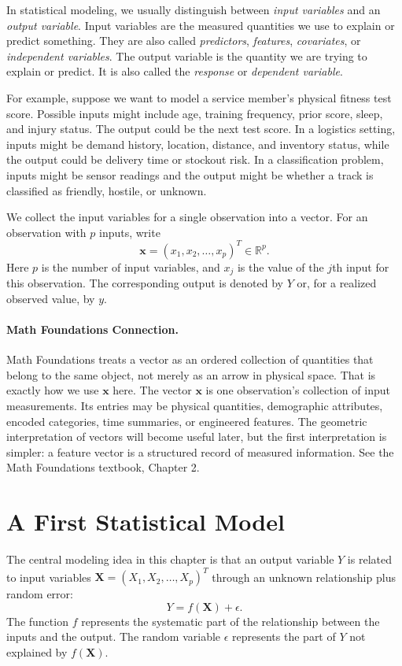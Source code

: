 In statistical modeling, we usually distinguish between \emph{input variables} and an \emph{output variable}.  Input variables are the measured quantities we use to explain or predict something.  They are also called \emph{predictors}, \emph{features}, \emph{covariates}, or \emph{independent variables}.  The output variable is the quantity we are trying to explain or predict.  It is also called the \emph{response} or \emph{dependent variable}.

For example, suppose we want to model a service member's physical fitness test score.  Possible inputs might include age, training frequency, prior score, sleep, and injury status.  The output could be the next test score.  In a logistics setting, inputs might be demand history, location, distance, and inventory status, while the output could be delivery time or stockout risk.  In a classification problem, inputs might be sensor readings and the output might be whether a track is classified as friendly, hostile, or unknown.

We collect the input variables for a single observation into a vector.  For an observation with $p$ inputs, write
\[
  \mathbf{x} = (x_1,x_2,\ldots,x_p)^T \in \mathbb{R}^p.
\]
Here $p$ is the number of input variables, and $x_j$ is the value of the $j$th input for this observation.  The corresponding output is denoted by $Y$ or, for a realized observed value, by $y$.

\paragraph{Math Foundations Connection.}
Math Foundations treats a vector as an ordered collection of quantities that belong to the same object, not merely as an arrow in physical space.  That is exactly how we use $\mathbf{x}$ here.  The vector $\mathbf{x}$ is one observation's collection of input measurements.  Its entries may be physical quantities, demographic attributes, encoded categories, time summaries, or engineered features.  The geometric interpretation of vectors will become useful later, but the first interpretation is simpler: a feature vector is a structured record of measured information.  See the Math Foundations textbook, Chapter 2.

\section{A First Statistical Model}

The central modeling idea in this chapter is that an output variable $Y$ is related to input variables $\mathbf{X} = (X_1,X_2,\ldots,X_p)^T$ through an unknown relationship plus random error:
\begin{equation}
  Y = f(\mathbf{X}) + \epsilon.
  \label{eq:general-stat-model}
\end{equation}
The function $f$ represents the systematic part of the relationship between the inputs and the output.  The random variable $\epsilon$ represents the part of $Y$ not explained by $f(\mathbf{X})$.

